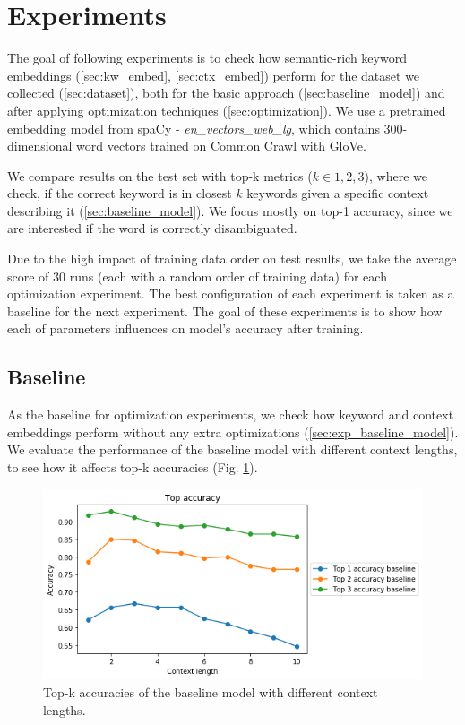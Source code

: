 \documentclass{llncs}
\begin{document}
\section{Experiments}
\label{sec:experiments}
The goal of following experiments is to check how semantic-rich keyword embeddings (\ref{sec:kw_embed}, \ref{sec:ctx_embed}) perform for the dataset we collected (\ref{sec:dataset}), both for the basic approach (\ref{sec:baseline_model}) and after applying optimization techniques (\ref{sec:optimization}).
We use a pretrained embedding model from spaCy - \textit{en\_vectors\_web\_lg}, which contains 300-dimensional word vectors trained on Common Crawl with GloVe\cite{spacymodel}.

We compare results on the test set with top-k metrics (\(k \in {1, 2, 3}\)), where we check, if the correct keyword is in closest \(k\) keywords given a specific context describing it (\ref{sec:baseline_model}). We focus mostly on top-1 accuracy, since we are interested if the word is correctly disambiguated.

Due to the high impact of training data order on test results, we take the average score of 30 runs (each with a random order of training data) for each optimization experiment.
The best configuration of each experiment is taken as a baseline for the next experiment.
The goal of these experiments is to show how each of parameters influences on model's accuracy after training.

\subsection{Baseline}
\label{sec:exp_baseline}
As the baseline for optimization experiments, we check how keyword and context embeddings perform without any extra optimizations (\ref{sec:exp_baseline_model}).
We evaluate the performance of the baseline model with different context lengths, to see how it affects top-k accuracies (Fig. \ref{fig:baseline}).

\begin{figure}
    \centering
    \caption{Top-k accuracies of the baseline model with different context lengths.}
    \label{fig:baseline}
    \includegraphics[scale=0.7]{res/baseline_context_top_acc.png}
\end{figure}
\end{document}
